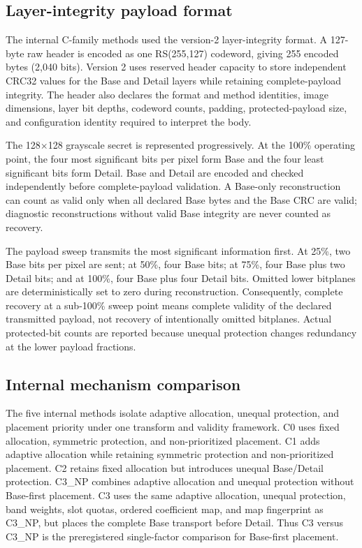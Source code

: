 \subsection{Layer-integrity payload format}

The internal C-family methods used the version-2 layer-integrity format. A 127-byte raw header is encoded as one RS(255,127) codeword, giving 255 encoded bytes (2,040 bits). Version 2 uses reserved header capacity to store independent CRC32 values for the Base and Detail layers while retaining complete-payload integrity. The header also declares the format and method identities, image dimensions, layer bit depths, codeword counts, padding, protected-payload size, and configuration identity required to interpret the body.

The 128$\times$128 grayscale secret is represented progressively. At the 100\% operating point, the four most significant bits per pixel form Base and the four least significant bits form Detail. Base and Detail are encoded and checked independently before complete-payload validation. A Base-only reconstruction can count as valid only when all declared Base bytes and the Base CRC are valid; diagnostic reconstructions without valid Base integrity are never counted as recovery.

The payload sweep transmits the most significant information first. At 25\%, two Base bits per pixel are sent; at 50\%, four Base bits; at 75\%, four Base plus two Detail bits; and at 100\%, four Base plus four Detail bits. Omitted lower bitplanes are deterministically set to zero during reconstruction. Consequently, complete recovery at a sub-100\% sweep point means complete validity of the declared transmitted payload, not recovery of intentionally omitted bitplanes. Actual protected-bit counts are reported because unequal protection changes redundancy at the lower payload fractions.

\subsection{Internal mechanism comparison}

The five internal methods isolate adaptive allocation, unequal protection, and placement priority under one transform and validity framework. C0 uses fixed allocation, symmetric protection, and non-prioritized placement. C1 adds adaptive allocation while retaining symmetric protection and non-prioritized placement. C2 retains fixed allocation but introduces unequal Base/Detail protection. C3\_NP combines adaptive allocation and unequal protection without Base-first placement. C3 uses the same adaptive allocation, unequal protection, band weights, slot quotas, ordered coefficient map, and map fingerprint as C3\_NP, but places the complete Base transport before Detail. Thus C3 versus C3\_NP is the preregistered single-factor comparison for Base-first placement.

